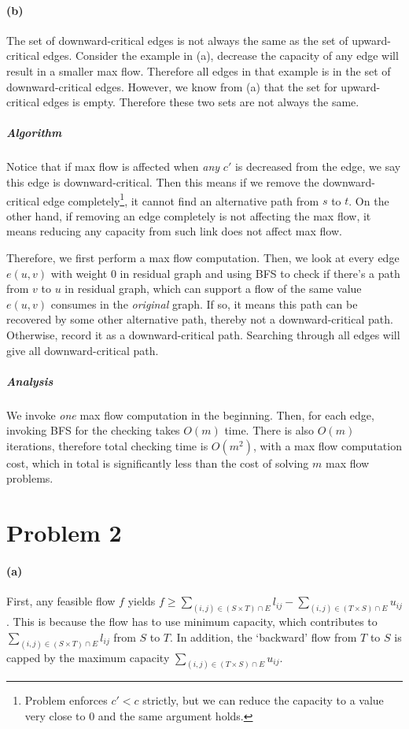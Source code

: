 \documentclass[12pt]{article}
\begin{document}
\paragraph{(b)} The set of downward-critical edges is not always the same as the set of upward-critical edges. Consider the example in (a), decrease the capacity of any edge will result in a smaller max flow. Therefore all edges in that example is in the set of downward-critical edges. However, we know from (a) that the set for upward-critical edges is empty. Therefore these two sets are not always the same.

\subparagraph{Algorithm} Notice that if max flow is affected when \emph{any} $c'$ is decreased from the edge, we say this edge is downward-critical. Then this means if we remove the downward-critical edge completely\footnote{Problem enforces $c'<c$ strictly, but we can reduce the capacity to a value very close to 0 and the same argument holds.}, it cannot find an alternative path from $s$ to $t$. On the other hand, if removing an edge completely is not affecting the max flow, it means reducing any capacity from such link does not affect max flow.

Therefore, we first perform a max flow computation. Then, we look at every edge $e(u,v)$ with weight $0$ in residual graph and using BFS to check if there's a path from $v$ to $u$ in residual graph, which can support a flow of the same value $e(u,v)$ consumes in the \emph{original} graph. If so, it means this path can be recovered by some other alternative path, thereby not a downward-critical path. Otherwise, record it as a downward-critical path. Searching through all edges will give all downward-critical path.

\subparagraph{Analysis} We invoke \emph{one} max flow computation in the beginning. Then, for each edge, invoking BFS for the checking takes $O(m)$ time. There is also $O(m)$ iterations, therefore total checking time is $O(m^2)$, with a max flow computation cost, which in total is significantly less than the cost of solving $m$ max flow problems.
\pagebreak

\section*{Problem 2}
\paragraph{(a)} First, any feasible flow $f$ yields $f \geq \sum_{(i,j)\in(S\times T)\cap E}l_{ij} - \sum_{(i,j)\in(T\times S)\cap E}u_{ij}$. This is because the flow has to use minimum capacity, which contributes to $\sum_{(i,j)\in(S\times T)\cap E}l_{ij}$ from $S$ to $T$. In addition, the `backward' flow from $T$ to $S$ is capped by the maximum capacity $\sum_{(i,j)\in(T\times S)\cap E}u_{ij}$. 
\end{document}
